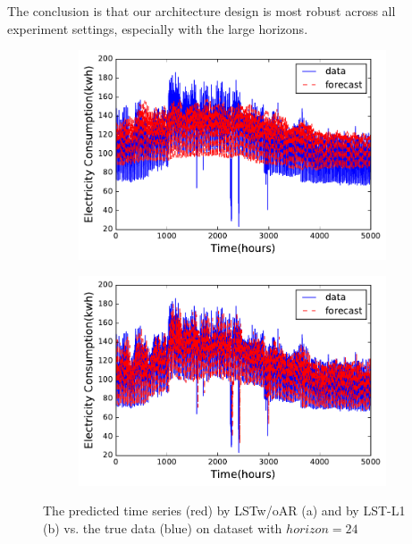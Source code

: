 The conclusion is that our architecture design is most robust across all experiment settings, especially with the large horizons.

\begin{figure}[!t]
\begin{subfigure}{.45\textwidth}
  \centering
  \includegraphics[width=\linewidth]{fig/woar.pdf}
  \caption{}
\end{subfigure}
\begin{subfigure}{.45\textwidth}
  \centering
  \includegraphics[width=\linewidth]{fig/war.pdf}
  \caption{}
\end{subfigure}
\caption{The predicted time series (red) by LSTw/oAR (a) and by LST-L1  (b) vs. the true data (blue) on \electricity dataset with $horizon = 24$}
\label{fig:electricity}
\end{figure}

